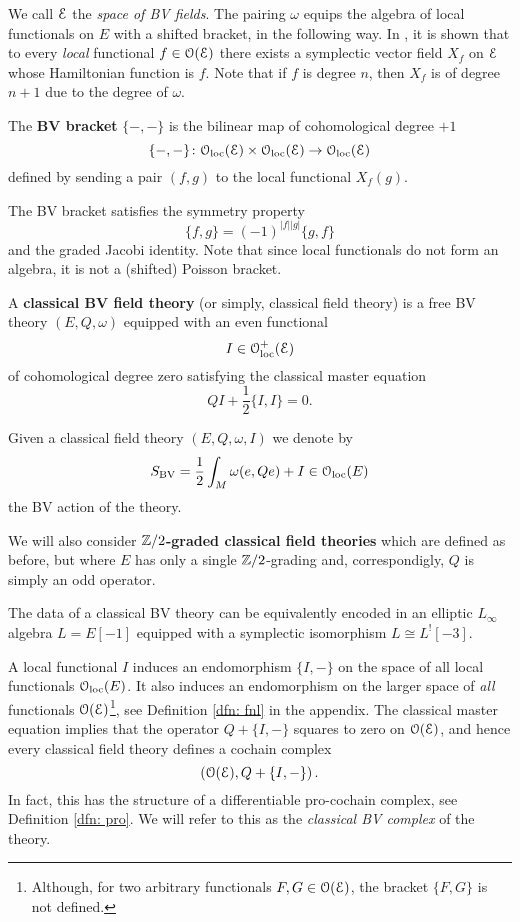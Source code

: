 \documentclass[10pt, oneside]{article}
\begin{document}
We call $\mathcal E$ the {\em space of BV fields}.  
The pairing $\omega$ equips the algebra of local functionals on $E$ with a shifted bracket, in the following way.
In \cite[Chapter 5, Section 3]{CostelloBook}, it is shown that to every {\em local} functional $f \in \mathcal O(\mathcal E)$ there exists a symplectic vector field $X_f$ on $\mathcal E$ whose Hamiltonian function is $f$. 
Note that if $f$ is degree $n$, then $X_f$ is of degree $n+1$ due to the degree of $\omega$. 

\begin{definition}
The {\bf BV bracket} $\{-,-\}$ is the bilinear map of cohomological degree $+1$
\[
\{-,-\}\colon \mathcal{O}_{\rm loc}(\mathcal E) \times \mathcal{O}_{\rm loc}(\mathcal E) \to \mathcal{O}_{\rm loc}(\mathcal E)
\]
defined by sending a pair $(f,g)$ to the local functional $X_f (g)$.
\end{definition}

The BV bracket satisfies the symmetry property
\[\{f, g\} = (-1)^{|f| |g|} \{g, f\}\]
and the graded Jacobi identity. Note that since local functionals do not form an algebra, it is not a (shifted) Poisson bracket. 

\begin{definition}
A {\bf classical BV field theory} (or simply, classical field theory) is a free BV theory $(E, Q, \omega)$ equipped with an even functional
\[I \in \mathcal{O}_{\rm loc}^+(\mathcal E)\]
of cohomological degree zero satisfying the classical master equation 
\[Q I + \frac{1}{2} \{I,I\} = 0 .\]
\end{definition}

Given a classical field theory $(E, Q, \omega, I)$ we denote by
\[S_{\mathrm{BV}} = \frac{1}{2} \int_M \omega(e, Q e) + I\in \mathcal{O}_{\rm loc}(E)\]
the BV action of the theory.

\begin{remark}
We will also consider {\bf $\mathbb Z/2$-graded classical field theories} which are defined as before, but where $E$ has only a single $\mathbb Z/2$-grading and, correspondigly, $Q$ is simply an odd operator.
\end{remark}

\begin{remark}
The data of a classical BV theory can be equivalently encoded in an elliptic $L_\infty$ algebra $L=E[-1]$ equipped with a symplectic isomorphism $L\cong L^![-3]$.
\end{remark}

A local functional $I$ induces an endomorphism $\{I,-\}$ on the space of all local functionals $\mathcal{O}_{\rm loc}(E)$. 
It also induces an endomorphism on the larger space of {\em all} functionals $\mathcal O(\mathcal E)$\footnote{Although, for two arbitrary functionals $F, G \in \mathcal O(\mathcal E)$, the bracket $\{F,G\}$ is not defined.}, see Definition \ref{dfn: fnl} in the appendix. 
The classical master equation implies that the operator $Q + \{I,-\}$ squares to zero on $\mathcal O(\mathcal E)$, and hence every classical field theory defines a cochain complex
\begin{equation}\label{bvcplx}
\left(\mathcal O(\mathcal E), Q + \{I,-\}\right) .
\end{equation}
In fact, this has the structure of a differentiable pro-cochain complex, see Definition \ref{dfn: pro}. 
We will refer to this as the {\em classical BV complex} of the theory. 
\end{document}
